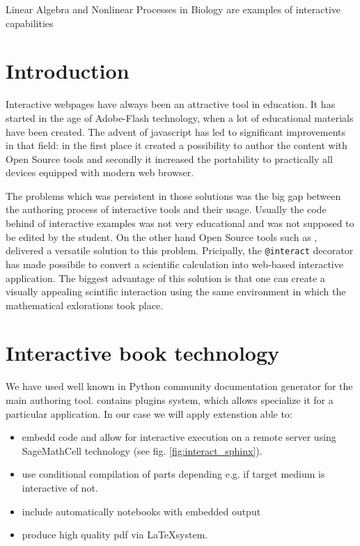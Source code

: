 \documentclass{deliverablereport}
\author{Marcin Kostur, Jerzy Łuczka, Jan Aksamit, Jolanta Marzec}
\begin{document}
\maketitle

Linear Algebra and Nonlinear Processes in Biology are examples of
interactive capabilities


\section{Introduction}

Interactive webpages have always been an attractive tool in
education. It has started in the age of Adobe-Flash technology, when a
lot of educational materials have been created. The advent of
javascript has led to significant improvements in that field: in the
first place it created a possibility to author the content with
Open Source tools and secondly it increased the portability to
practically all devices equipped with modern web browser.

The problems which was persistent in those solutions was the big gap
between the authoring process of interactive tools and their
usage. Usually the code behind of interactive examples was not very
educational and was not supposed to be edited by the student. On the
other hand Open Source tools such as \Sage, delivered a versatile
solution to this problem. Pricipally, the \texttt{@interact} decorator
has made possibile to convert a scientific calculation into web-based
interactive application. The biggest advantage of this solution is
that one can create a visually appealing scintific interaction using
the same environment in which the mathematical exlorations took place.


\section{Interactive book technology}

We have used well known in Python community \Sphinx documentation
generator for the main authoring tool. \Sphinx contains plugins system,
which allows specialize it for a particular application. In our case
we will apply extenstion able to: 

\begin{itemize}
\item embedd \Sage code and allow for interactive execution on a
  remote server using SageMathCell technology (see
  fig. \ref{fig:interact_sphinx}).
\item use conditional compilation of parts depending e.g. if target
  medium is interactive of not.
\item include automatically \Jupyter notebooks with embedded output
\item produce high quality pdf via \LaTeX system.
\end{itemize}  
\end{document}
